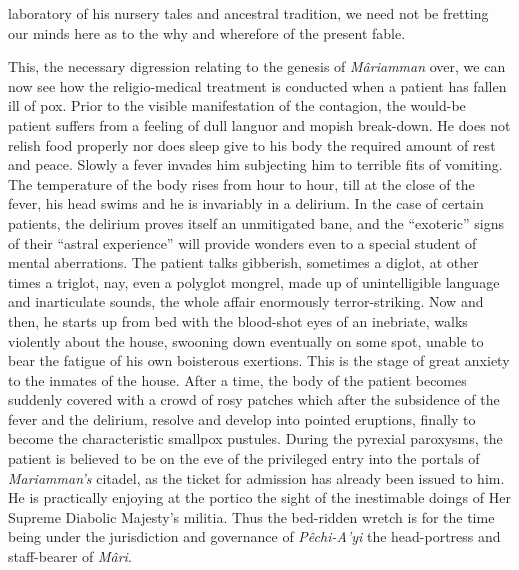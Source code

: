 \documentclass[a4paper, 12pt, oneside, english]{article}
\begin{document}
laboratory of his nursery tales and ancestral tradition, we need not be fretting our minds here as to the why and wherefore of the present fable.

This, the necessary digression relating to the genesis of \emph{Mâriamman} over, we can now see how the religio-medical treatment is conducted when a patient has fallen ill of pox. Prior to the visible manifestation of the contagion, the would-be patient suffers from a feeling of dull languor and mopish break-down. He does not relish food properly nor does sleep give to his body the required amount of rest and peace. Slowly a fever invades him subjecting him to terrible fits of vomiting. The temperature of the body rises from hour to hour, till at the close of the fever, his head swims and he is invariably in a delirium. In the case of certain patients, the delirium proves itself an unmitigated bane, and the ``exoteric'' signs of their ``astral experience'' will provide wonders even to a special student of mental aberrations. The patient talks gibberish, sometimes a diglot, at other times a triglot, nay, even a polyglot mongrel, made up of unintelligible language and inarticulate sounds, the whole affair enormously terror-striking. Now and then, he starts up from bed with the blood-shot eyes of an inebriate, walks violently about the house, swooning down eventually on some spot, unable to bear the fatigue of his own boisterous exertions. This is the stage of great anxiety to the inmates of the house. After a time, the body of the patient becomes suddenly covered with a crowd of rosy patches which after the subsidence of the fever and the delirium, resolve and develop into pointed eruptions, finally to become the characteristic smallpox pustules. During the pyrexial paroxysms, the patient is believed to be on the eve of the privileged entry into the portals of \emph{Mariamman's} citadel, as the ticket for admission has already been issued to him. He is practically enjoying at the portico the sight of the inestimable doings of Her Supreme Diabolic Majesty's militia. Thus the bed-ridden wretch is for the time being under the jurisdiction and governance of \emph{Pêchi-A'yi} the head-portress and staff-bearer of \emph{Mâri}.
\end{document}
